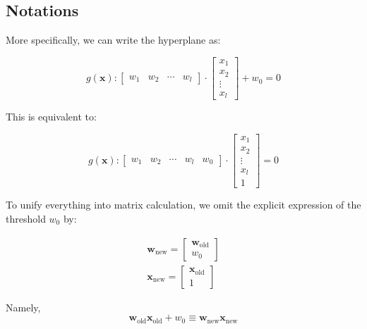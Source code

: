 \documentclass{article}
\begin{document}
\subsection{Notations}

More specifically, we can write the hyperplane as:

\begin{equation}
    g(\mathbf{x}): 
    \begin{bmatrix}
        w_{1} & w_{2} & \cdots & w_{l}
    \end{bmatrix}
    \cdot
    \begin{bmatrix}
        x_{1} \\ x_{2} \\ \vdots \\ x_{l}
    \end{bmatrix}
    + w_{0} = 0
\end{equation}

This is equivalent to:

\begin{equation}
    g(\mathbf{x}): 
    \begin{bmatrix}
        w_{1} & w_{2} & \cdots & w_{l} & w_{0}
    \end{bmatrix}
    \cdot
    \begin{bmatrix}
        x_{1} \\ x_{2} \\ \vdots \\ x_{l} \\ 1
    \end{bmatrix}
    = 0
\end{equation}

To unify everything into matrix calculation, we omit the explicit
expression of the threshold $w_{0}$ by:

\begin{align}
    \mathbf{w}_{\text{new}} = \begin{bmatrix}
        \mathbf{w}_{\text{old}} \\ w_{0}
    \end{bmatrix} \\
    \mathbf{x}_{\text{new}} = \begin{bmatrix}
        \mathbf{x}_{\text{old}} \\ 1
    \end{bmatrix}
\end{align}

Namely,
\begin{equation}
    \mathbf{w}_{\text{old}}\mathbf{x}_{\text{old}} + w_{0} 
    \equiv \mathbf{w}_{\text{new}} \mathbf{x}_{\text{new}}
\end{equation}
\end{document}
